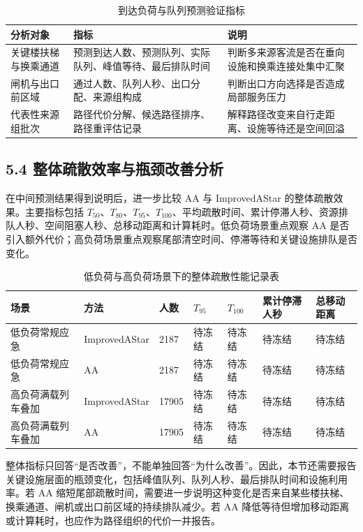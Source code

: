 \documentclass[UTF8,a4paper,12pt]{ctexart}
\begin{document}
\begin{table}[htbp]
\centering
\caption{到达负荷与队列预测验证指标}
\small
\begin{tabular}{p{}p{}p{}}
\toprule
分析对象 & 指标 & 说明 \\
\midrule
关键楼扶梯与换乘通道 & 预测到达人数、预测队列、实际队列、峰值等待、最后排队时间 & 判断多来源客流是否在垂向设施和换乘连接处集中汇聚 \\
闸机与出口前区域 & 通过人数、队列人秒、出口分配、来源组构成 & 判断出口方向选择是否造成局部服务压力 \\
代表性来源组批次 & 路径代价分解、候选路径排序、路径重评估记录 & 解释路径改变来自行走距离、设施等待还是空间回溢 \\
\bottomrule
\end{tabular}
\end{table}

\subsection{5.4 整体疏散效率与瓶颈改善分析}

在中间预测结果得到说明后，进一步比较 AA 与 ImprovedAStar 的整体疏散效果。主要指标包括 \(T_{50}\)、\(T_{80}\)、\(T_{95}\)、\(T_{100}\)、平均疏散时间、累计停滞人秒、资源排队人秒、空间阻塞人秒、总移动距离和计算耗时。低负荷场景重点观察 AA 是否引入额外代价；高负荷场景重点观察尾部清空时间、停滞等待和关键设施排队是否变化。

\begin{table}[htbp]
\centering
\caption{低负荷与高负荷场景下的整体疏散性能记录表}
\small
\begin{tabular}{p{}p{}p{}p{}p{}p{}p{}}
\toprule
场景 & 方法 & 人数 & \(T_{95}\) & \(T_{100}\) & 累计停滞人秒 & 总移动距离 \\
\midrule
低负荷常规应急 & ImprovedAStar & 2187 & 待冻结 & 待冻结 & 待冻结 & 待冻结 \\
低负荷常规应急 & AA & 2187 & 待冻结 & 待冻结 & 待冻结 & 待冻结 \\
高负荷满载列车叠加 & ImprovedAStar & 17905 & 待冻结 & 待冻结 & 待冻结 & 待冻结 \\
高负荷满载列车叠加 & AA & 17905 & 待冻结 & 待冻结 & 待冻结 & 待冻结 \\
\bottomrule
\end{tabular}
\end{table}

整体指标只回答“是否改善”，不能单独回答“为什么改善”。因此，本节还需要报告关键设施层面的瓶颈变化，包括峰值队列、队列人秒、最后排队时间和设施利用率。若 AA 缩短尾部疏散时间，需要进一步说明这种变化是否来自某些楼扶梯、换乘通道、闸机或出口前区域的持续排队减少。若 AA 降低等待但增加移动距离或计算耗时，也应作为路径组织的代价一并报告。
\end{document}
